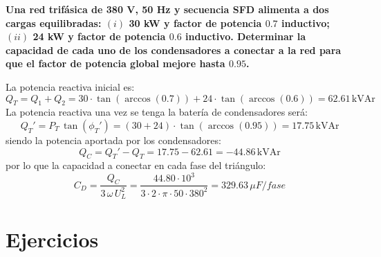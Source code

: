 \documentclass[11pt]{book} %
\begin{document}
		\begin{example}\label{ex.compensacion_Q_trif}
		    \textbf{Una red trifásica de 380 V, 50 Hz y secuencia SFD alimenta a dos cargas equilibradas: $(i)$ 30 kW y factor de potencia $0.7$ inductivo; $(ii)$ 24 kW y factor de potencia $0.6$ inductivo. Determinar la capacidad de cada uno de los condensadores a conectar a la red para que el factor de potencia global mejore hasta $0.95$.}
		    
		    La potencia reactiva inicial es:
		    \begin{equation*}
		        Q_T=Q_1+Q_2=30\cdot \tan(\arccos(0.7))+24\cdot \tan(\arccos(0.6))=62.61\,\text{kVAr}
		    \end{equation*}
		    La potencia reactiva una vez se tenga la batería de condensadores será: 
		    \begin{equation*}
		        Q_T'=P_T\,\tan(\phi_T')=(30+24)\cdot \tan(\arccos(0.95))=17.75\,\text{kVAr}
		    \end{equation*}
		    siendo la potencia aportada por los condensadores:
		    \begin{equation*}
		        Q_C=Q_T'-Q_T=17.75-62.61=-44.86\,\text{kVAr}
		    \end{equation*}
		    por lo que la capacidad a conectar en cada fase del triángulo: 
		    \begin{equation*}
		     C_D=\dfrac{Q_C}{3\,\omega\,U_L^2}=\dfrac{44.80\cdot 10^3}{3\cdot 2\cdot \pi\cdot 50\cdot 380^2}=329.63\,\mu F/fase
		    \end{equation*}
		\end{example}

		 \section{Ejercicios}
		 
		 
	
	
	
	
\end{document}
